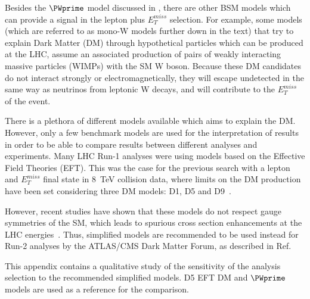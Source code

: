 Besides the $\PWprime$ model discussed in , there are other BSM models 
which can provide a signal in the lepton plus $E_{T}^{miss}$ selection.
For example, some models (which are referred to as mono-W models further down in the text) that try to explain Dark Matter (DM) through hypothetical particles which can be produced at the LHC, assume an associated production of pairs of weakly interacting massive particles (WIMPs) with the SM W boson.
Because these DM candidates do not interact strongly or electromagnetically, they will escape undetected in the same way as neutrinos from leptonic W decays, and will contribute to the $E_{T}^{miss}$ of the event.

There is a plethora of different models available which aims to explain the DM.
However, only a few benchmark models are used for the interpretation of results in order to be able to compare results between different analyses and experiments.
Many LHC Run-1 analyses were using models based on the Effective Field Theories (EFT). 
This was the case for the previous search with a lepton and $E_T^{miss}$ final state in 8~TeV collision data, where limits on the DM production have been set considering three DM models: D1, D5 and D9~\cite{wprime_8TeV}. 

However, recent studies have shown that these models do not respect gauge symmetries of the SM, which leads to spurious cross section enhancements at the LHC energies~\cite{arXiv:1503.07874}.
Thus, simplified models are recommended to be used instead for Run-2 analyses
by the ATLAS/CMS Dark Matter Forum, as described in Ref.~\cite{DM_forum_2015}

This appendix contains a qualitative study of the sensitivity of the analysis selection
to the recommended simplified models. D5 EFT DM and $\PWprime$ models are used as a reference for the comparison.



